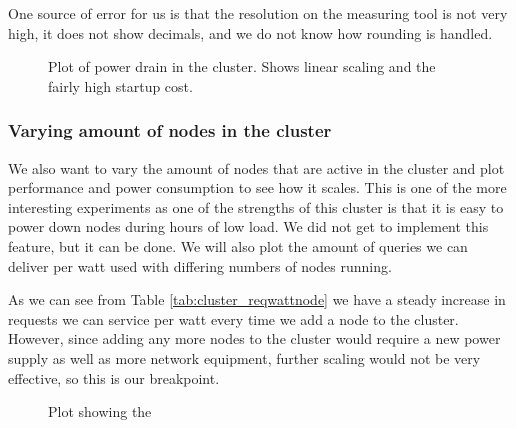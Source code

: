 One source of error for us is that the resolution on the measuring tool is not very high, it does not show decimals, and we do not know how rounding is handled.

\begin{figure}[!h]
\centering
	\caption{Plot of power drain in the cluster. Shows linear scaling and the fairly high startup cost.}
\end{figure}

\subsubsection{Varying amount of nodes in the cluster}
We also want to vary the amount of nodes that are active in the cluster and plot performance and power consumption to see how it scales.
This is one of the more interesting experiments as one of the strengths of this cluster is that it is easy to power down nodes during hours of low load. We did not get to implement this feature, but it can be done. We will also plot the amount of queries we can deliver per watt used with differing numbers of nodes running.

As we can see from Table \ref{tab:cluster_reqwattnode} we have a steady increase in requests we can service per watt every time we add a node to the cluster. However, since adding any more nodes to the cluster would require a new power supply as well as more network equipment, further scaling would not be very effective, so this is our breakpoint.

\begin{figure}[!h]
\centering
	\caption{Plot showing the }
\end{figure}

